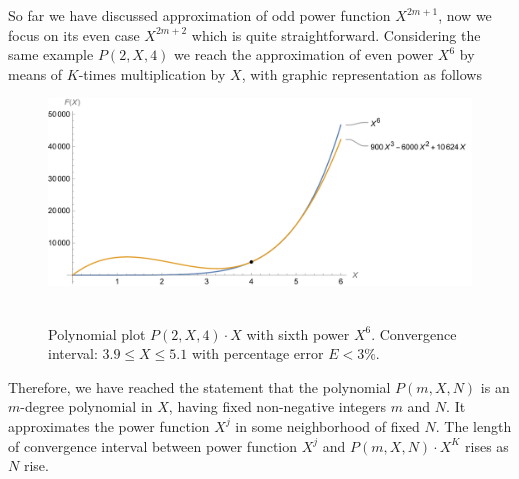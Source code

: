 So far we have discussed approximation of odd power function $X^{2m+1}$, now we focus on its even case $X^{2m+2}$
which is quite straightforward.
Considering the same example $P(2, X, 4)$ we reach the approximation of even power $X^6$
by means of $K$-times multiplication by $X$, with graphic representation as follows
\begin{figure}[H]
    \centering
    \includegraphics[width=1\textwidth]{sections/images/07_plot_of_6th_power_with_p_2_4_times_x}
    ~\caption{Polynomial plot $P(2, X, 4)\cdot X$ with sixth power $X^6$.
    Convergence interval: $3.9 \leq X \leq 5.1$ with percentage error $E < 3\%$.
    }\label{fig:07_plot_of_6th_power_with_p_2_4_times_x}
\end{figure}
Therefore, we have reached the statement that
the polynomial $P(m,X,N)$ is an $m$-degree polynomial in $X$, having fixed non-negative
integers $m$ and $N$.
It approximates the power function $X^{j}$ in some neighborhood of fixed $N$.
The length of convergence interval between power function $X^j$ and $P(m,X,N) \cdot X^K$ rises as $N$ rise.
